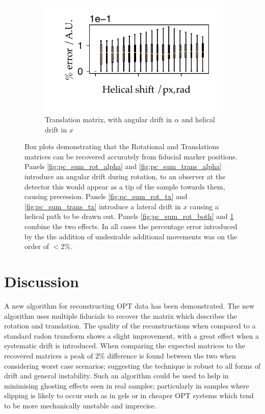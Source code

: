\begin{figure}
\begin{subfigure}[t]{0.5\textwidth}
          \includegraphics{Chapters/flopt/Figs/PDF/results/helix/decompose/pc_sum_trans_both}
          \caption{Translation matrix, with angular drift in $\alpha$ and helical drift in $x$}\label{fig:pc_sum_trans_both}
        \end{subfigure}
          \caption{Box plots demonstrating that the Rotational and Translations matrices can be recovered accurately from fiducial marker positions.
          Panels \ref{fig:pc_sum_rot_alpha} and \ref{fig:pc_sum_trans_alpha} introduce an angular drift during rotation, to an observer at the detector this would appear as a tip of the sample towards them, causing precession.
          Panels \ref{fig:pc_sum_rot_tx} and \ref{fig:pc_sum_trans_tx} introduce a lateral drift in $x$ causing a helical path to be drawn out.
          Panels \ref{fig:pc_sum_rot_both} and \ref{fig:pc_sum_trans_both} combine the two effects.
          In all cases the percentage error introduced by the the addition of undesirable additional movements was on the order of $<2\%$.
          }
          \label{fig:pc_sum_decompose}
\end{figure}

\section{Discussion}

A new algorithm for reconstructing OPT data has been demonstrated.
The new algorithm uses multiple fiducials to recover the matrix which describes the rotation and translation.
The quality of the reconstructions when compared to a standard radon transform shows a slight improvement, with a great effect when a systematic drift is introduced.
When  comparing the expected matrices to the recovered matrices a peak of $2\%$ difference is found between the two when considering worst case scenarios; suggesting the technique is robust to all forms of drift and general instability.
Such an algorithm could be used to help in minimising ghosting effects seen in real samples; particularly in samples where slipping is likely to occur such as in gels or in cheaper OPT systems which tend to be more mechanically unstable and imprecise.


